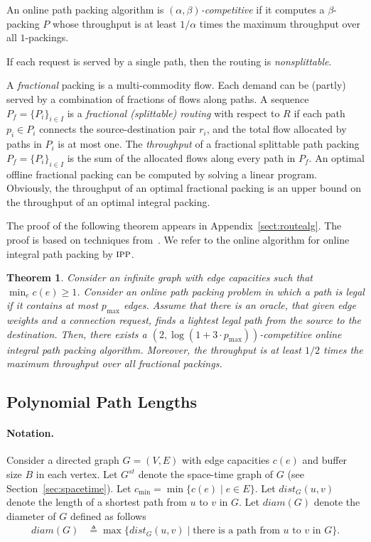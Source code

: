 \documentclass[11pt]{article}
\newtheorem{theorem}{Theorem}
\newcommand{\route}{\text{\sc{ipp}}}
\newcommand{\pmax}{p_{\max}}
\newcommand{\eqdf}{\triangleq}
\newenvironment{proof sketch}[1]{\noindent {\emph{Proof sketch of #1:}}}{\hfill \qed}
\newcommand{\diam}{\textit{diam}}
\newcommand{\dist}{\textit{dist}}
\begin{document}
An online path packing algorithm is \emph{$(\alpha,\beta)$-competitive} if it computes a $\beta$-packing $P$ whose throughput is at least $1/\alpha$ times the maximum   throughput over all $1$-packings.

If each request is served by a single path, then the routing is
\emph{nonsplittable}.

A \emph{fractional} packing is a multi-commodity flow. Each
demand can be (partly) served by a combination of fractions
of flows along paths. A sequence $P_f=\{P_i\}_{i \in I}$ is
a \emph{fractional (splittable) routing} with respect to
$R$ if each path $p_i \in P_i$ connects the
source-destination pair $r_i$, and the total flow allocated
by paths in $P_i$ is at most one. The \emph{throughput} of
a fractional splittable path packing $P_f=\{P_i\}_{i\in I}$
is the sum of the allocated flows along every path in
$P_f$. An optimal offline fractional packing can be
computed by solving a linear program. Obviously, the
throughput of an optimal fractional packing is an upper
bound on the throughput of an optimal integral packing.


The proof of the following theorem appears in Appendix~\ref{sect:routealg}.
The proof is based on techniques from~\cite{AAP, BN06}.
We refer to the online algorithm for online integral path packing by $\route$.

\begin{theorem}\label{thm:IPP}
  Consider an infinite graph with edge capacities such that $\min_{e}
  c(e) \geq 1$.  Consider an online path packing problem in which a
  path is legal if it contains at most $\pmax$ edges.
Assume that there is an oracle, that given edge weights and a
  connection request, finds a
  lightest legal path from the source to the destination. Then, there
exists a $(2,\log(1+ 3\cdot \pmax))$-competitive online
  integral path packing algorithm.  Moreover, the throughput is at least
$1/2$ times the maximum throughput over all fractional packings.
\end{theorem}

\subsection{Polynomial Path Lengths}
\paragraph{Notation.}
Consider a directed graph $G=(V,E)$ with edge capacities $c(e)$ and
buffer size $B$ in each vertex.  Let $G^{st}$ denote the space-time
graph of $G$ (see Section~\ref{sec:spacetime}).  Let $c_{\min} =
\min\{c(e) \mid e\in E\}$.  Let
$\dist_G(u,v)$ denote the length of a shortest path from $u$ to $v$ in
$G$. Let $\diam(G)$ denote the diameter of $G$ defined as follows
\begin{align*}
  \diam(G) &\eqdf \max \{ \dist_{G}(u,v) \mid \text{there is a path from $u$ to $v$ in $G$}\}.
\end{align*}
\end{document}
